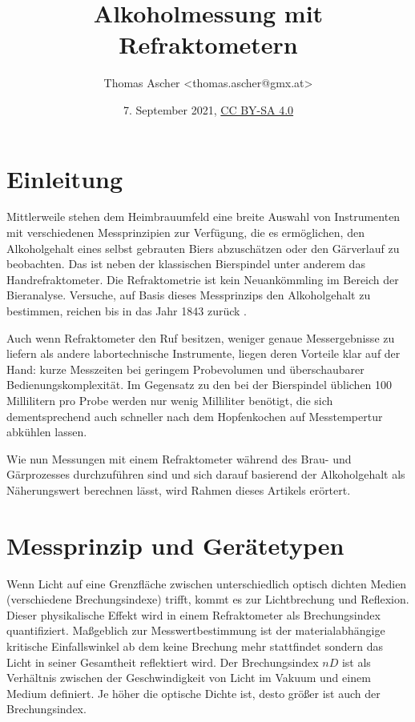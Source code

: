 \documentclass[a4paper,parskip=half]{scrartcl}
\title{Alkoholmessung mit Refraktometern}
\author{Thomas Ascher <thomas.ascher@gmx.at>}
\date{7. September 2021, \href{http://creativecommons.org/licenses/by-sa/4.0/}{CC BY-SA 4.0}}
\begin{document}
\maketitle

\section*{Einleitung}

Mittlerweile stehen dem Heimbrauumfeld eine breite Auswahl von Instrumenten
mit verschiedenen Messprinzipien zur Verfügung, die es ermöglichen, den
Alkoholgehalt eines selbst gebrauten Biers abzuschätzen oder den
Gärverlauf zu beobachten. Das ist neben der klassischen Bierspindel
unter anderem das Handrefraktometer. Die Refraktometrie ist
kein Neuankömmling im Bereich der Bieranalyse. Versuche,
auf Basis dieses Messprinzips den Alkoholgehalt zu bestimmen, reichen bis
in das Jahr 1843 zurück \parencite[102]{Gamer1959}.

Auch wenn Refraktometer den Ruf besitzen, weniger genaue Messergebnisse
zu liefern als andere labortechnische Instrumente, liegen deren
Vorteile klar auf der Hand: kurze Messzeiten bei geringem Probevolumen
und überschaubarer Bedienungskomplexität. Im Gegensatz zu den bei der
Bierspindel üblichen 100 Millilitern pro Probe werden nur wenig
Milliliter benötigt, die sich dementsprechend auch schneller nach dem
Hopfenkochen auf Messtempertur abkühlen lassen. \parencites[171\psq]{Bettner1969}{Terrill2011}

Wie nun Messungen mit einem Refraktometer während des Brau- und
Gärprozesses durchzuführen sind und sich darauf basierend der
Alkoholgehalt als Näherungswert berechnen lässt, wird
Rahmen dieses Artikels erörtert.

\section*{Messprinzip und Gerätetypen}

Wenn Licht auf eine Grenzfläche zwischen unterschiedlich optisch
dichten Medien (verschiedene Brechungsindexe) trifft,
kommt es zur Lichtbrechung und Reflexion. Dieser physikalische Effekt
wird in einem Refraktometer als Brechungsindex quantifiziert.
Maßgeblich zur Messwertbestimmung ist der materialabhängige
kritische Einfallswinkel ab dem keine Brechung mehr stattfindet
sondern das Licht in seiner Gesamtheit reflektiert wird.
Der Brechungsindex \(\mathit{nD}\) ist als Verhältnis zwischen der
Geschwindigkeit von Licht im Vakuum und einem Medium definiert. Je höher
die optische Dichte ist, desto größer ist auch der Brechungsindex.
\parencites{AKRSSOGH2021}[43]{Bonham2001}[102\psq]{Gamer1959}
\end{document}
